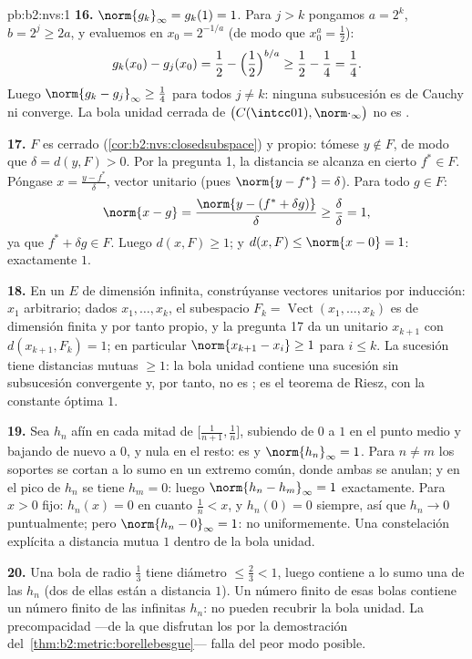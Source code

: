\begin{solution}{pb:b2:nvs:1}
\textbf{16.} $\norm{g_k}_\infty = g_k(1) = 1$. Para $j > k$
pongamos $a = 2^k$, $b = 2^j \geq 2a$, y evaluemos en $x_0 =
2^{-1/a}$ (de modo que $x_0^a = \frac12$):
\[
g_k(x_0) - g_j(x_0) = \frac12 - \Bigl(\frac12\Bigr)^{b/a}
\geq \frac12 - \frac14 = \frac14 .
\]
Luego $\norm{g_k - g_j}_\infty \geq \frac14$ para todos $j \neq
k$: ninguna subsucesión es de Cauchy ni converge. La bola unidad
cerrada de $\bigl(C(\intcc01), \norm\cdot_\infty\bigr)$ no es
.

\textbf{17.} $F$ es cerrado (\cref{cor:b2:nvs:closedsubspace}) y
propio: tómese $y \notin F$, de modo que $\delta = d(y, F) > 0$.
Por la pregunta 1, la distancia se alcanza en cierto $f^* \in F$.
Póngase $x = \frac{y - f^*}{\delta}$, vector unitario (pues
$\norm{y - f^*} = \delta$). Para todo $g \in F$:
\[
\norm{x - g} = \frac{\norm{y - (f^* + \delta g)}}{\delta}
\geq \frac{\delta}{\delta} = 1 ,
\]
ya que $f^* + \delta g \in F$. Luego $d(x, F) \geq 1$; y $d(x, F)
\leq \norm{x - 0} = 1$: exactamente $1$.

\textbf{18.} En un $E$ de dimensión infinita, constrúyanse
vectores unitarios por inducción: $x_1$ arbitrario; dados $x_1,
\dots, x_k$, el subespacio $F_k = \operatorname{Vect}(x_1, \dots,
x_k)$ es de dimensión finita y por tanto propio, y la pregunta 17
da un unitario $x_{k+1}$ con $d(x_{k+1}, F_k) = 1$; en particular
$\norm{x_{k+1} - x_i} \geq 1$ para $i \leq k$. La sucesión tiene
distancias mutuas $\geq 1$: la bola unidad contiene una sucesión
sin subsucesión convergente y, por tanto, no es ; es el
teorema de Riesz, con la constante óptima $1$.

\textbf{19.} Sea $h_n$ afín en cada mitad de
$\bigl[\frac1{n+1}, \frac1n\bigr]$, subiendo de $0$ a $1$ en el
punto medio y bajando de nuevo a $0$, y nula en el resto: es
 y $\norm{h_n}_\infty = 1$. Para $n \neq m$ los soportes
se cortan a lo sumo en un extremo común, donde ambas se anulan; y
en el pico de $h_n$ se tiene $h_m = 0$: luego $\norm{h_n -
h_m}_\infty = 1$ exactamente. Para $x > 0$ fijo: $h_n(x) = 0$ en
cuanto $\frac1n < x$, y $h_n(0) = 0$ siempre, así que $h_n \to 0$
puntualmente; pero $\norm{h_n - 0}_\infty = 1$: no uniformemente.
Una constelación explícita a distancia mutua $1$ dentro de la bola
unidad.

\textbf{20.} Una bola de radio $\frac13$ tiene diámetro $\leq
\frac23 < 1$, luego contiene a lo sumo una de las $h_n$ (dos de
ellas están a distancia $1$). Un número finito de esas bolas
contiene un número finito de las infinitas $h_n$: no pueden
recubrir la bola unidad. La precompacidad ---de la que disfrutan
los  por la demostración del~\cref{thm:b2:metric:borellebesgue}--- falla del peor modo
posible.


\end{solution}
